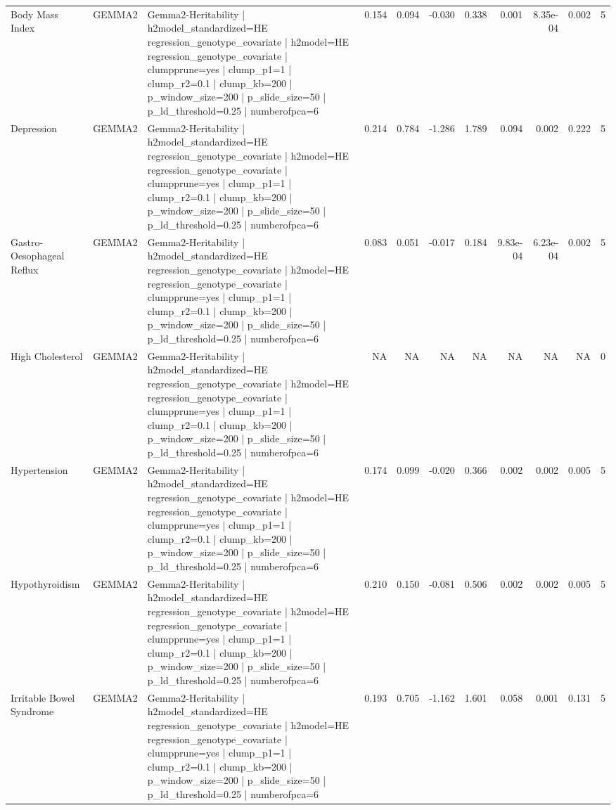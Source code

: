 \begin{landscape}
\begin{longtable}{p{2.4cm}p{1.8cm}p{6.0cm}rrrrrrrr}
Body Mass Index & GEMMA2 & Gemma2-Heritability | h2model\_standardized=HE regression\_genotype\_covariate | h2model=HE regression\_genotype\_covariate | clumpprune=yes | clump\_p1=1 | clump\_r2=0.1 | clump\_kb=200 | p\_window\_size=200 | p\_slide\_size=50 | p\_ld\_threshold=0.25 | numberofpca=6 & 0.154 & 0.094 & -0.030 & 0.338 & 0.001 & 8.35e-04 & 0.002 & 5 \\
Depression & GEMMA2 & Gemma2-Heritability | h2model\_standardized=HE regression\_genotype\_covariate | h2model=HE regression\_genotype\_covariate | clumpprune=yes | clump\_p1=1 | clump\_r2=0.1 | clump\_kb=200 | p\_window\_size=200 | p\_slide\_size=50 | p\_ld\_threshold=0.25 | numberofpca=6 & 0.214 & 0.784 & -1.286 & 1.789 & 0.094 & 0.002 & 0.222 & 5 \\
Gastro-Oesophageal Reflux & GEMMA2 & Gemma2-Heritability | h2model\_standardized=HE regression\_genotype\_covariate | h2model=HE regression\_genotype\_covariate | clumpprune=yes | clump\_p1=1 | clump\_r2=0.1 | clump\_kb=200 | p\_window\_size=200 | p\_slide\_size=50 | p\_ld\_threshold=0.25 | numberofpca=6 & 0.083 & 0.051 & -0.017 & 0.184 & 9.83e-04 & 6.23e-04 & 0.002 & 5 \\
High Cholesterol & GEMMA2 & Gemma2-Heritability | h2model\_standardized=HE regression\_genotype\_covariate | h2model=HE regression\_genotype\_covariate | clumpprune=yes | clump\_p1=1 | clump\_r2=0.1 | clump\_kb=200 | p\_window\_size=200 | p\_slide\_size=50 | p\_ld\_threshold=0.25 | numberofpca=6 & NA & NA & NA & NA & NA & NA & NA & 0 \\
Hypertension & GEMMA2 & Gemma2-Heritability | h2model\_standardized=HE regression\_genotype\_covariate | h2model=HE regression\_genotype\_covariate | clumpprune=yes | clump\_p1=1 | clump\_r2=0.1 | clump\_kb=200 | p\_window\_size=200 | p\_slide\_size=50 | p\_ld\_threshold=0.25 | numberofpca=6 & 0.174 & 0.099 & -0.020 & 0.366 & 0.002 & 0.002 & 0.005 & 5 \\
Hypothyroidism & GEMMA2 & Gemma2-Heritability | h2model\_standardized=HE regression\_genotype\_covariate | h2model=HE regression\_genotype\_covariate | clumpprune=yes | clump\_p1=1 | clump\_r2=0.1 | clump\_kb=200 | p\_window\_size=200 | p\_slide\_size=50 | p\_ld\_threshold=0.25 | numberofpca=6 & 0.210 & 0.150 & -0.081 & 0.506 & 0.002 & 0.002 & 0.005 & 5 \\
Irritable Bowel Syndrome & GEMMA2 & Gemma2-Heritability | h2model\_standardized=HE regression\_genotype\_covariate | h2model=HE regression\_genotype\_covariate | clumpprune=yes | clump\_p1=1 | clump\_r2=0.1 | clump\_kb=200 | p\_window\_size=200 | p\_slide\_size=50 | p\_ld\_threshold=0.25 | numberofpca=6 & 0.193 & 0.705 & -1.162 & 1.601 & 0.058 & 0.001 & 0.131 & 5 \\

\end{longtable}
\end{landscape}
